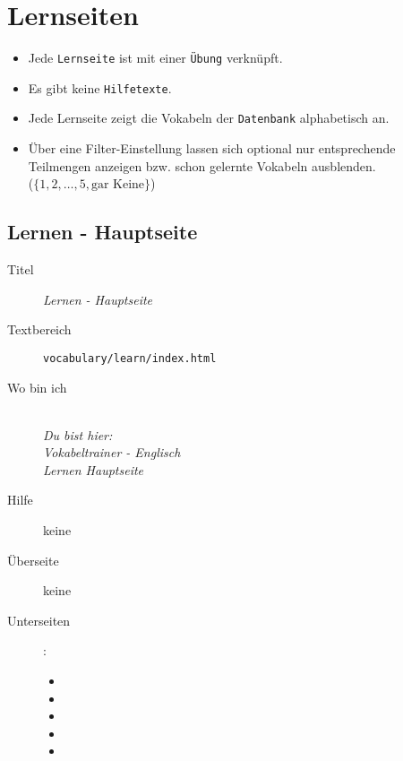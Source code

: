 \section{ Lernseiten }
\label{has:voc-learn}

\begin{itemize}
	\item Jede \texttt{Lernseite} ist mit einer \texttt{Übung} verknüpft.
	\item Es gibt keine \texttt{Hilfetexte}.
	\item Jede Lernseite zeigt die Vokabeln der \texttt{Datenbank} alphabetisch an.
	\item Über eine Filter-Einstellung lassen sich optional nur entsprechende Teilmengen anzeigen bzw. schon gelernte Vokabeln ausblenden. \\
		($\{1, 2, \ldots, 5, \text{gar Keine}\}$)
\end{itemize}

\subsection{ Lernen - Hauptseite }
\label{has:voc-learn-page0}
\begin{description}
	\item[Titel] \emph{ Lernen - Hauptseite }
	\item[Textbereich] \texttt{vocabulary/learn/index.html}
	\item[Wo bin ich] \emph{\\Du bist hier:\\Vokabeltrainer - Englisch\\Lernen Hauptseite}
	\item[Hilfe] keine
	\item[Überseite] keine
	\item[Unterseiten] :
	\begin{itemize}
		\item {}
		\item {}
		\item {}
		\item {}
		\item {}
	\end{itemize}
\end{description}


